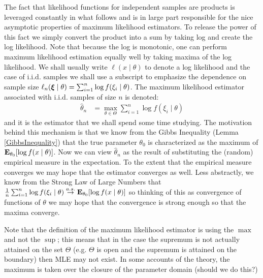 The fact that likelihood functions for independent samples are products
is leveraged constantly in what follows and is in large part
responsible for the nice asymptotic properties of maximum likelihood
estimators.  To release the power of this fact we simply convert the
product into a sum by taking log and create the log likelihood.  Note that because the log is
monotonic, one can perform maximum likelihood estimation equally well
by taking maxima of the log likelihood.  We shall usually write
$\ell(x \mid \theta)$ to denote a log likelihood and the case of
i.i.d. samples we shall use a subscript to emphasize the
dependence on sample size $\ell_n(\sample{\xi} \mid \theta) =
\sum_{i=1}^n\log f(\xi_i \mid \theta)$.  The maximum likelihood estimator
associated with i.i.d. samples of size $n$ is denoted:
\begin{align*}
\hat{\theta}_n &= \max_{\theta \in \Theta} \sum_{i=1}^n \log f(\xi_i \mid \theta)
\end{align*}
and it is the estimator that we shall spend some time studying.  The
motivation behind this mechanism is that we know from the Gibbs
Inequality (Lemma \ref{GibbsInequality}) that the true parameter
$\theta_0$ is characterized as the maximum of $\sexpectation{\log f(x
  \mid \theta)}{\theta_0}$.  Now we can view $\hat{\theta}_n$ as the
result of substituting the (random) empirical measure in the
expectation.  To the extent that the empirical measure converges we
may hope that the estimator converges as well.  Less abstractly, we
know from the Strong Law of Large Numbers that
$\frac{1}{n}\sum_{i=1}^n \log f(\xi_i \mid \theta) \toas
\sexpectation{ \log f(x \mid
  \theta)}{\theta_0}$ so thinking of this as convergence of functions
of $\theta$ we may hope that the convergence is strong enough so that
the maxima converge.

Note that the definition of the maximum likelihood estimator is using
the $\max$ and not the $\sup$; this means that in the case the
supremum is not actually attained on the set $\Theta$ (e.g. $\Theta$
is open and the supremum is attained on the boundary) then MLE may not
exist.  In some accounts of the theory, the maximum is taken over the
closure of the parameter domain (should we do this?)

